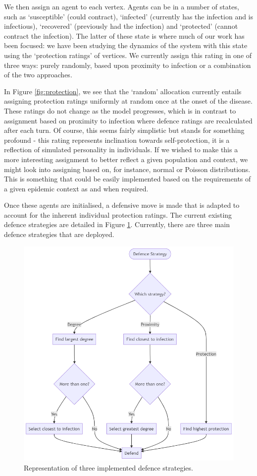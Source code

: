 \documentclass[../report.tex]{subfiles}
\begin{document}
We then assign an agent to each vertex. Agents can be in a number of states, such as `susceptible' (could contract), `infected' (currently has the infection and is infectious), `recovered' (previously had the infection) and `protected' (cannot contract the infection). The latter of these state is where much of our work has been focused: we have been studying the dynamics of the system with this state using the `protection ratings' of vertices. We currently assign this rating in one of three ways: purely randomly, based upon proximity to infection or a combination of the two approaches.

In Figure \ref{fig:protection}, we see that the `random' allocation currently entails assigning protection ratings uniformly at random once at the onset of the disease. These ratings do not change as the model progresses, which is in contrast to assignment based on proximity to infection where defence ratings are recalculated after each turn. Of course, this seems fairly simplistic but stands for something profound - this rating represents inclination towards self-protection, it is a reflection of simulated personality in individuals. If we wished to make this a more interesting assignment to better reflect a given population and context, we might look into assigning based on, for instance, normal or Poisson distributions. This is something that could be easily implemented based on the requirements of a given epidemic context as and when required.

Once these agents are initialised, a defensive move is made that is adapted to account for the inherent individual protection ratings. The current existing defence strategies are detailed in Figure \ref{fig:defence}. Currently, there are three main defence strategies that are deployed.

\begin{figure}[!ht]
  \centering
  \includegraphics[width=0.75\linewidth]{assets/defence}
  \caption{Representation of three implemented defence strategies.}
  \label{fig:defence}
\end{figure}
\end{document}
